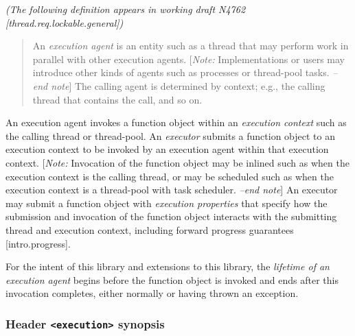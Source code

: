 \documentclass[a4paper,12pt,notitlepage,twoside,openright]{article}
\begin{document}
\emph{(The following definition appears in working draft N4762
{[}thread.req.lockable.general{]})}

\begin{quote}
An \emph{execution agent} is an entity such as a thread that may perform
work in parallel with other execution agents. {[}\emph{Note:}
Implementations or users may introduce other kinds of agents such as
processes or thread-pool tasks. \emph{--end note}{]} The calling agent
is determined by context; e.g., the calling thread that contains the
call, and so on.
\end{quote}

An execution agent invokes a function object within an \emph{execution
context} such as the calling thread or thread-pool. An \emph{executor}
submits a function object to an execution context to be invoked by an
execution agent within that execution context. {[}\emph{Note:}
Invocation of the function object may be inlined such as when the
execution context is the calling thread, or may be scheduled such as
when the execution context is a thread-pool with task scheduler.
\emph{--end note}{]} An executor may submit a function object with
\emph{execution properties} that specify how the submission and
invocation of the function object interacts with the submitting thread
and execution context, including forward progress guarantees
{[}intro.progress{]}.

For the intent of this library and extensions to this library, the
\emph{lifetime of an execution agent} begins before the function object
is invoked and ends after this invocation completes, either normally or
having thrown an exception.

\hypertarget{header-execution-synopsis}{%
\subsubsection{\texorpdfstring{Header \texttt{<execution>}
synopsis}{Header  synopsis}}\label{header-execution-synopsis}}
\end{document}
